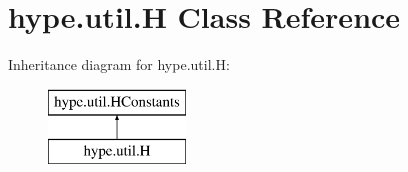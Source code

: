 \hypertarget{classhype_1_1util_1_1_h}{\section{hype.\-util.\-H Class Reference}
\label{classhype_1_1util_1_1_h}
}
Inheritance diagram for hype.\-util.\-H\-:\begin{figure}[H]
\begin{center}
\leavevmode
\includegraphics[height=2.000000cm]{classhype_1_1util_1_1_h}
\end{center}
\end{figure}
